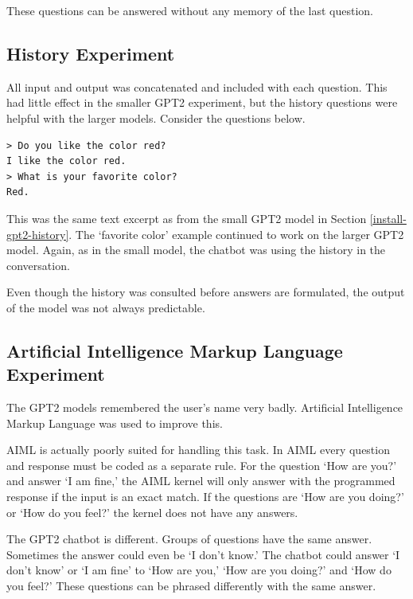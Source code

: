 These questions can be answered without any memory of the last question.

\subsection{History Experiment}

All input and output was concatenated and included with each question. This had little effect in the smaller GPT2 experiment, but the history questions were helpful with the larger models. Consider the questions below.
\begin{verbatim}
> Do you like the color red?
I like the color red.
> What is your favorite color?
Red.
\end{verbatim}
This was the same text excerpt as from the small GPT2 model in Section \ref{install-gpt2-history}. The `favorite color' example continued to work on the larger GPT2 model. Again, as in the small model, the chatbot was using the history in the conversation. 

Even though the history was consulted before answers are formulated, the output of the model was not always predictable. %


\subsection{Artificial Intelligence Markup Language Experiment}

The GPT2 models remembered the user's name very badly. %
Artificial Intelligence Markup Language was used to improve this. 

AIML is actually poorly suited for handling this task. In AIML every question and response must be coded as a separate rule. For the question `How are you?' and answer `I am fine,' the AIML kernel will only answer with the programmed response if the input is an exact match. If the questions are `How are you doing?' or `How do you feel?' the kernel does not have any answers. %

The GPT2 chatbot is different. Groups of questions have the same answer. Sometimes the answer could even be `I don't know.' The chatbot could answer `I don't know' or `I am fine' to  `How are you,'  `How are you doing?' and `How do you feel?' These questions can be phrased differently with the same answer.


